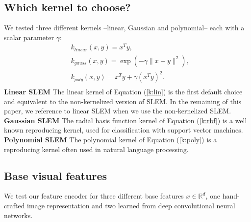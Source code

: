 \subsection{Which kernel to choose?}
We tested three different kernels --linear, Gaussian and polynomial-- each with a scalar parameter $\gamma$:
\begin{align}
    &k_{linear}(x,y) = x^Ty, \label{k:lin}\\
    &k_{gauss}(x,y) = \exp(-\gamma\|x-y \|^2), \label{k:rbf}\\
    &k_{poly}(x,y) = x^Ty+\gamma(x^Ty)^2. \label{k:poly}\\
\end{align}
\textbf{Linear SLEM} The linear kernel of Equation (\ref{k:lin}) is the first default choice and equivalent to the non-kernelized version of SLEM.
In the remaining of this paper, we reference to linear SLEM when we use the non-kernelized SLEM.
\textbf{Gaussian SLEM} The radial basis function kernel of Equation (\ref{k:rbf}) is a
well known reproducing kernel, used for classification with support vector machines.
\textbf{Polynomial SLEM} The polynomial kernel of Equation (\ref{k:poly}) is a reproducing kernel often used in natural language processing.


\subsection{Base visual features}
We test our feature encoder for three different base features $x\in\mathbb{R}^d$, one hand-crafted image representation and two learned from deep convolutional neural networks.


